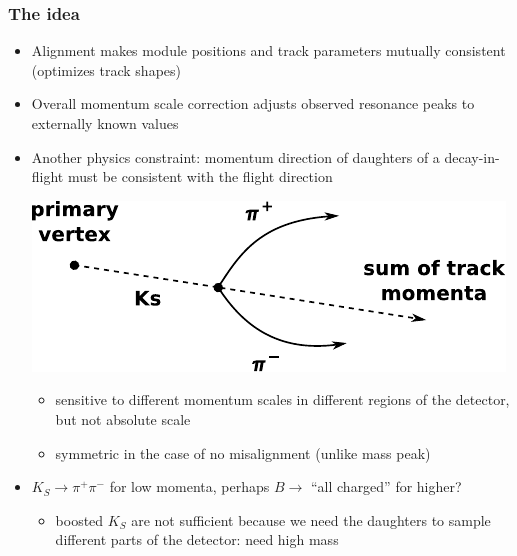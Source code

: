 \documentclass[compress]{beamer}
\begin{document}
\begin{frame}
\frametitle{The idea}

\begin{itemize}
\item Alignment makes module positions and track parameters mutually
  consistent (optimizes track shapes)
\item Overall momentum scale correction adjusts observed resonance
  peaks to externally known values
\item Another physics constraint: momentum direction of daughters of a
  decay-in-flight must be consistent with the flight direction

\begin{center}
\includegraphics[width=0.5\linewidth]{diagram.pdf}
\end{center}

\vspace{-0.5 cm}
\begin{itemize}
\item sensitive to different momentum scales in different regions of the detector, but not absolute scale
\item symmetric in the case of no misalignment (unlike mass peak)
\end{itemize}

\item $K_S \to \pi^+\pi^-$ for low momenta, perhaps $B \to$ ``all charged'' for \mbox{higher?\hspace{-1 cm}}
\begin{itemize}
\item boosted $K_S$ are not sufficient because we need the daughters to sample different parts of the detector: need high mass
\end{itemize}
\end{itemize}
\end{frame}
\end{document}
